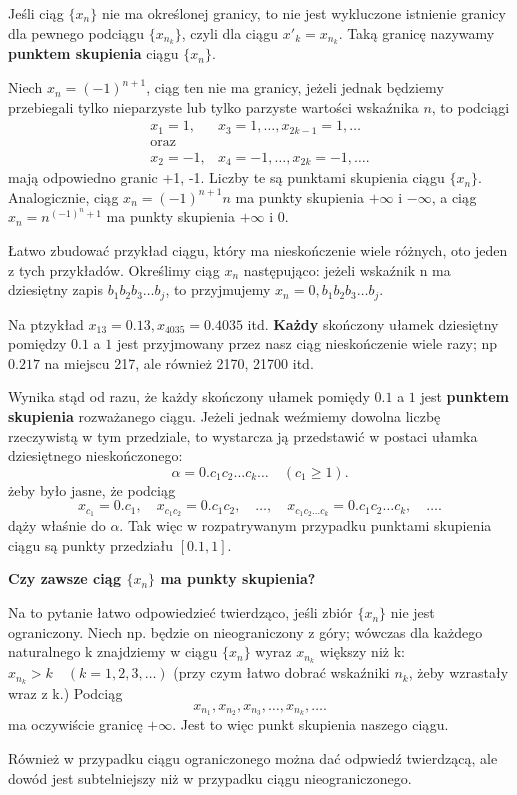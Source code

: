 Jeśli ciąg $\{x_{n}\} $ nie ma określonej granicy, to nie jest wykluczone istnienie granicy dla pewnego podciągu $\{x_{n_{k}}\} $, czyli dla ciągu $x'_{k} = x_{n_{k}}$. Taką granicę nazywamy \textbf{punktem skupienia}  ciągu $\{x_{n}\} $.
\begin{eg}
	Niech $x_{n} = \left( -1 \right) ^{n+1}$, ciąg ten nie ma granicy, jeżeli jednak będziemy przebiegali tylko nieparzyste lub tylko parzyste wartości wskaźnika $n$, to podciągi
		\begin{align*}
		x_1 = 1, &x_3 = 1, \ldots, x_{2k-1} = 1, \ldots \\
		\text{oraz}\\
		x_2 = -1, &x_4 = -1, \ldots, x_{2k} = -1,\ldots
	.\end{align*}
	mają odpowiedno granic +1, -1. Liczby te są punktami skupienia ciągu $\{x_{n}\} $. Analogicznie, ciąg $x_{n} = \left( -1 \right)^{n+1}n$ ma punkty skupienia $+\infty$ i $-\infty$, a ciąg $x_{n} = n^{\left( -1 \right)^{n} + 1 }$ ma punkty skupienia $+\infty$ i $0$.

	Łatwo zbudować przykład ciągu, który ma nieskończenie wiele różnych, oto jeden z tych przykładów. Określimy ciąg $x_{n}$ następująco: jeżeli wskaźnik n ma dziesiętny zapis $b_1b_2b_3\ldots b_{j}$, to przyjmujemy $x_{n} = 0,b_1b_2b_3\ldots b_{j}$.

	Na ptzykład $x_{13} = 0.13, x_{4035} = 0.4035$ itd. \textbf{Każdy}  skończony ułamek dziesiętny pomiędzy $0.1$ a $1$ jest przyjmowany przez nasz ciąg nieskończenie wiele razy; np $0.217$ na miejscu 217, ale również 2170, 21700 itd.

	Wynika stąd od razu, że każdy skończony ułamek pomiędy $0.1$ a $1$ jest \textbf{punktem skupienia} rozważanego ciągu. Jeżeli jednak weźmiemy dowolna liczbę rzeczywistą w tym przedziale, to wystarcza ją przedstawić w postaci ułamka dziesiętnego nieskończonego:
	\[
	\alpha=0.c_1c_2\ldots c_{k}\ldots\quad (c_1\ge 1)
	.\] 
	żeby było jasne, że podciąg
	\[
	x_{c_1} = 0.c_1,\quad x_{c_1c_2}= 0.c_1c_2,\quad\ldots,\quad x_{c_1c_2\ldots c_{k}} = 0.c_1c_2\ldots c_{k},\quad \ldots
	.\] 
	dąży właśnie do $\alpha$. Tak więc w rozpatrywanym przypadku punktami skupienia ciągu są punkty przedziału $[0.1, 1]$.

	\textbf{Czy zawsze ciąg $\{x_{n}\} $ ma punkty skupienia?}

	Na to pytanie łatwo odpowiedzieć twierdząco, jeśli zbiór $\{x_{n}\} $ nie jest ograniczony. Niech np. będzie on nieograniczony z góry; wówczas dla każdego naturalnego k znajdziemy w ciągu $\{x_{n}\}$ wyraz $x_{n_{k}}$ większy niż k: $x_{n_{k}} > k \quad (k=1,2,3,\ldots)$
(przy czym łatwo dobrać wskaźniki $n_{k}$, żeby wzrastały wraz z k.) Podciąg \[
x_{n_1}, x_{n_2}, x_{n_3},\ldots,x_{n_{k}},\ldots
.\] 
ma oczywiście granicę $+\infty$. Jest to więc punkt skupienia naszego ciągu.

Również w przypadku ciągu ograniczonego można dać odpwiedź twierdzącą, ale dowód jest subtelniejszy niż w przypadku ciągu nieograniczonego.
\end{eg} 
